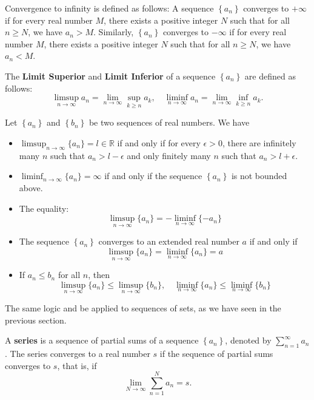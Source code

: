 \documentclass[../main.tex]{subfiles}
\begin{document}
Convergence to infinity is defined as follows: A sequence $\left\{ a_n \right\}$ converges to $+\infty$ if for every real number $M$, there exists a positive integer $N$ such that for all $n \geq N$, we have $a_n > M$. Similarly, $\left\{ a_n \right\}$ converges to $-\infty$ if for every real number $M$, there exists a positive integer $N$ such that for all $n \geq N$, we have $a_n < M$.

The \textbf{Limit Superior} and \textbf{Limit Inferior} of a sequence $\left\{ a_n \right\}$ are defined as follows:
\begin{equation}
	\limsup_{n \to \infty} a_n = \lim_{n \to \infty} \sup_{k \geq n} a_k, \quad \liminf_{n \to \infty} a_n = \lim_{n \to \infty} \inf_{k \geq n} a_k.
\end{equation}

Let $\left\{ a_n \right\}$ and $\left\{ b_n \right\}$ be two sequences of real numbers. We have
\begin{itemize}
	\item $\limsup_{n \to \infty} \{a_n\} = l \in \mathbb{R}$ if and only if for every $\epsilon > 0$, there are infinitely many $n$ such that $a_n > l - \epsilon$ and only finitely many $n$ such that $a_n > l + \epsilon$.
	\item $\liminf_{n \to \infty} \{a_n\} = \infty $ if and only if the sequence $\left\{ a_n \right\}$ is not bounded above.
	\item The equality:
	      \begin{equation}
		      \limsup_{n \to \infty} \{a_n\} = -\liminf_{n \to \infty} \{-a_n\}
	      \end{equation}
	\item The sequence $\left\{ a_n \right\}$ converges to an extended real number $a$ if and only if
	      \begin{equation}
		      \limsup_{n \to \infty} \{a_n\} = \liminf_{n \to \infty} \{a_n\} = a
	      \end{equation}
	\item If $a_n \leq b_n$ for all $n$, then
	      \begin{equation}
		      \limsup_{n \to \infty} \{a_n\} \leq \limsup_{n \to \infty} \{b_n\}, \quad \liminf_{n \to \infty} \{a_n\} \leq \liminf_{n \to \infty} \{b_n\}
	      \end{equation}
\end{itemize}
The same logic and be applied to sequences of sets, as we have seen in the previous section.

A \textbf{series} is a sequence of partial sums of a sequence $\left\{ a_n \right\}$, denoted by $\sum_{n=1}^{\infty} a_n$. The series converges to a real number $s$ if the sequence of partial sums converges to $s$, that is, if
\begin{equation}
	\lim_{N \to \infty} \sum_{n=1}^{N} a_n = s.
\end{equation}
\end{document}
